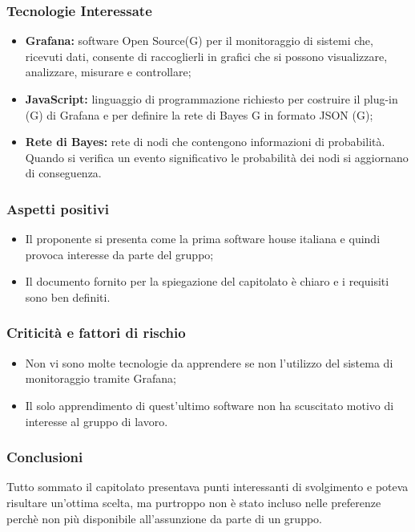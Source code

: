 \documentclass[a4paper, 11pt]{article}
\begin{document}
	\subsubsection{Tecnologie Interessate}
	\begin{itemize}
		\item \textbf{Grafana: }software Open Source(G) per il monitoraggio di sistemi che, ricevuti dati, consente di raccoglierli            					      in grafici che si possono visualizzare, analizzare, misurare e controllare; 
		\item \textbf{JavaScript: }linguaggio di programmazione richiesto per costruire il plug-in (G) di Grafana e
						per definire la rete di Bayes G in formato JSON (G);
		\item \textbf{Rete di Bayes: }rete di nodi che contengono informazioni di probabilità. Quando si verifica un evento 								     significativo le probabilità dei nodi si aggiornano di conseguenza.
	\end{itemize}
	\subsubsection{Aspetti positivi}
	\begin{itemize}
		\item Il proponente si presenta come la prima software house italiana e quindi provoca interesse da parte del gruppo;
		\item Il documento fornito per la spiegazione del capitolato è chiaro e i requisiti sono ben definiti.
	\end{itemize}
	\subsubsection{Criticità e fattori di rischio}
	\begin{itemize}
		\item Non vi sono molte tecnologie da apprendere se non l'utilizzo del sistema di monitoraggio tramite Grafana;
		\item Il solo apprendimento di quest'ultimo software non ha scuscitato motivo di interesse al gruppo di lavoro.
	\end{itemize}
	\subsubsection{Conclusioni}
		Tutto sommato il capitolato presentava punti interessanti di svolgimento e poteva risultare un'ottima scelta, ma 					purtroppo non è stato incluso nelle preferenze perchè non più disponibile all'assunzione da parte di un gruppo. 
\end{document}
